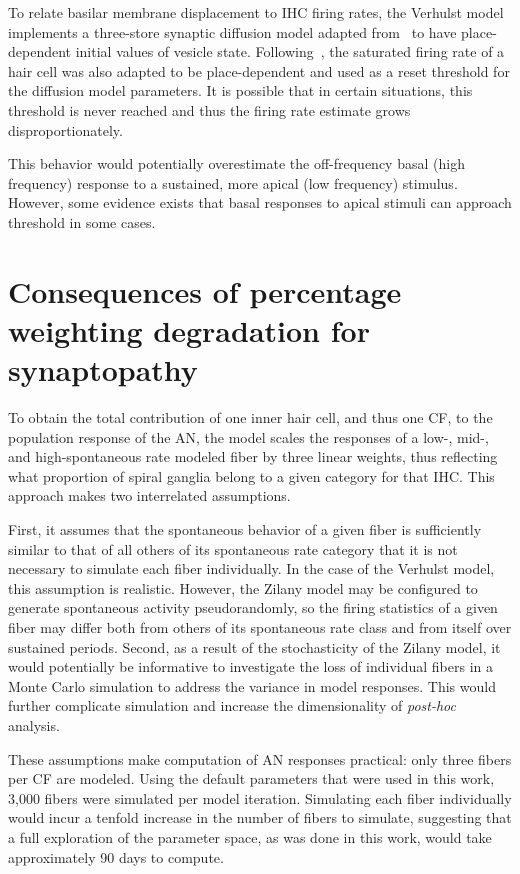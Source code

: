 To relate basilar membrane displacement to IHC firing rates, the Verhulst model implements a three-store synaptic diffusion model adapted from~\cite{Westerman1988Diffusion} to have place-dependent initial values of vesicle state.   Following~\cite{Liberman1978AuditoryNerve}, the saturated firing rate of a hair cell was also adapted to be place-dependent and used as a reset threshold for the diffusion model parameters.  It is possible that in certain situations, this threshold is never reached and thus the firing rate estimate grows disproportionately.  

This behavior would potentially overestimate the off-frequency basal (high frequency) response to a sustained, more apical (low frequency) stimulus.  However, some evidence exists \citep{Kiang1974Tails,Yates1990Basilar} that basal responses to apical stimuli can approach threshold in some cases. 

\section{Consequences of percentage weighting degradation for synaptopathy} %
\label{sec:consequences_of_percentage_weighting_degradation_for_synaptopathy}
To obtain the total contribution of one inner hair cell, and thus one CF, to the population response of the AN, the model scales the responses of a low-, mid-, and high-spontaneous rate modeled fiber by three linear weights, thus reflecting what proportion of spiral ganglia belong to a given category for that IHC.  This approach makes two interrelated assumptions.  

First, it assumes that the spontaneous behavior of a given fiber is sufficiently similar to that of all others of its spontaneous rate category that it is not necessary to simulate each fiber individually.  In the case of the Verhulst model, this assumption is realistic.  However, the Zilany model may be configured to generate spontaneous activity pseudorandomly, so the firing statistics of a given fiber may differ both from others of its spontaneous rate class and from itself over sustained periods.  Second, as a result of the stochasticity of the Zilany model, it would potentially be informative to investigate the loss of individual fibers in a Monte Carlo simulation to address the variance in model responses.  This would further complicate simulation and increase the dimensionality of \emph{post-hoc} analysis. 

These assumptions make computation of AN responses practical: only three fibers per CF are modeled.  Using the default parameters that were used in this work, 3,000 fibers were simulated per model iteration.  Simulating each fiber individually would incur a tenfold increase in the number of fibers to simulate, suggesting that a full exploration of the parameter space, as was done in this work, would take approximately 90 days to compute.  

